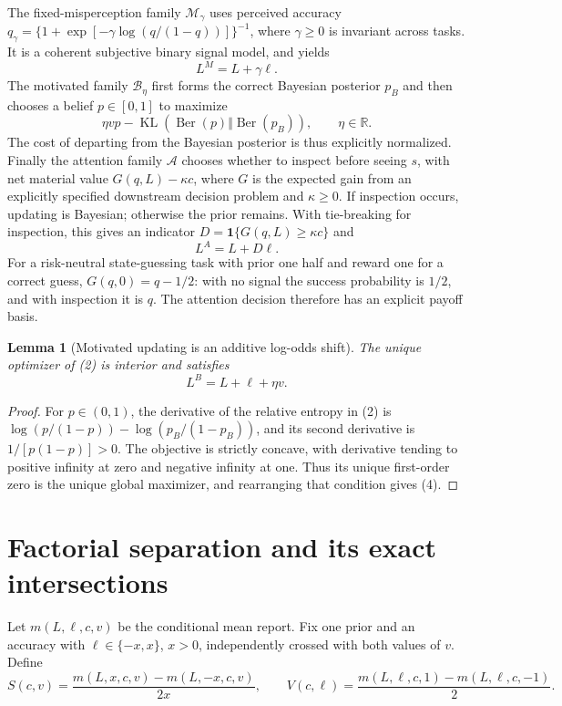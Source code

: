 \documentclass[11pt]{article}
\newtheorem{lemma}[theorem]{Lemma}
\theoremstyle{remark}
\newcommand{\R}{\mathbb R}
\newcommand{\Ind}{\mathbf 1}
\newcommand{\KL}{\operatorname{KL}}
\begin{document}
The fixed-misperception family $\mathcal M_\gamma$ uses perceived accuracy
$q_\gamma=\{1+\exp[-\gamma\log(q/(1-q))]\}^{-1}$, where $\gamma\geq0$ is invariant across tasks. It is a coherent subjective binary signal model, and yields
\[
 L^{M}=L+\gamma\ell.                                    \tag{1}
\]
The motivated family $\mathcal B_\eta$ first forms the correct Bayesian posterior $p_B$ and then chooses a belief $p\in[0,1]$ to maximize
\[
 \eta v p-\KL(\operatorname{Ber}(p)\Vert\operatorname{Ber}(p_B)),
 \qquad \eta\in\R.                                     \tag{2}
\]
The cost of departing from the Bayesian posterior is thus explicitly normalized. Finally the attention family $\mathcal A$ chooses whether to inspect before seeing $s$, with net material value $G(q,L)-\kappa c$, where $G$ is the expected gain from an explicitly specified downstream decision problem and $\kappa\geq0$. If inspection occurs, updating is Bayesian; otherwise the prior remains. With tie-breaking for inspection, this gives an indicator
$D=\Ind\{G(q,L)\geq\kappa c\}$ and
\[
 L^A=L+D\ell.                                          \tag{3}
\]
For a risk-neutral state-guessing task with prior one half and reward one for a correct guess, $G(q,0)=q-1/2$: with no signal the success probability is $1/2$, and with inspection it is $q$. The attention decision therefore has an explicit payoff basis.

\begin{lemma}[Motivated updating is an additive log-odds shift]
The unique optimizer of (2) is interior and satisfies
\[
 L^B=L+\ell+\eta v.                                    \tag{4}
\]
\end{lemma}
\begin{proof}
For $p\in(0,1)$, the derivative of the relative entropy in (2) is
$\log(p/(1-p))-\log(p_B/(1-p_B))$, and its second derivative is $1/[p(1-p)]>0$. The objective is strictly concave, with derivative tending to positive infinity at zero and negative infinity at one. Thus its unique first-order zero is the unique global maximizer, and rearranging that condition gives (4).
\end{proof}

\section{Factorial separation and its exact intersections}
Let $m(L,\ell,c,v)$ be the conditional mean report. Fix one prior and an accuracy with $\ell\in\{-x,x\}$, $x>0$, independently crossed with both values of $v$. Define
\[
 S(c,v)=\frac{m(L,x,c,v)-m(L,-x,c,v)}{2x},\qquad
 V(c,\ell)=\frac{m(L,\ell,c,1)-m(L,\ell,c,-1)}2.           \tag{5}
\]
\end{document}
